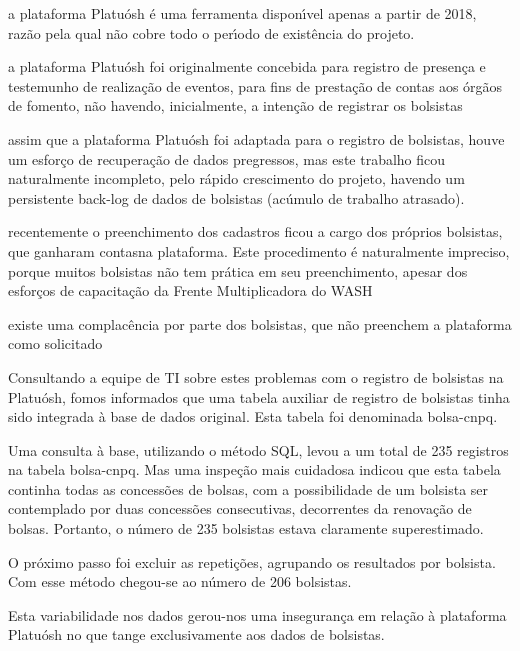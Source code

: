 \documentclass[
12pt,		%
openright,	%
twoside,  %
a4paper,			%
chapter=TITLE,		%
english,			%
french,				%
spanish,			%
brazil				%
]{USPSC-classe/USPSC}
\begin{document}
\begin{alineas}
\item a plataforma Platu\'osh \'e uma ferramenta dispon\'{\i}vel apenas a partir de 2018, raz\~ao pela qual n\~ao cobre todo o per\'{\i}odo de exist\^encia do projeto.
\item a plataforma Platu\'osh foi originalmente concebida para registro de presen\c{c}a e testemunho de realiza\c{c}\~ao de eventos, para fins de presta\c{c}\~ao de contas aos \'org\~aos de fomento, n\~ao havendo, inicialmente, a inten\c{c}\~ao de registrar os bolsistas
\item assim que a plataforma Platu\'osh foi adaptada para o registro de bolsistas, houve um esfor\c{c}o de recupera\c{c}\~ao de dados pregressos, mas este trabalho ficou naturalmente incompleto, pelo r\'apido crescimento do projeto, havendo um persistente back-log de dados de bolsistas (ac\'umulo de trabalho atrasado).
\item recentemente o preenchimento dos cadastros ficou a cargo dos pr\'oprios bolsistas, que ganharam \textquotedbl contas\textquotedbl  na plataforma. Este procedimento \'e naturalmente impreciso, porque muitos bolsistas n\~ao tem pr\'atica em seu preenchimento, apesar dos esfor\c{c}os de capacita\c{c}\~ao da Frente Multiplicadora do WASH
\item existe uma complac\^encia por parte dos bolsistas, que n\~ao preenchem a plataforma como solicitado
\end{alineas}

Consultando a equipe de TI sobre estes problemas com o registro de bolsistas na Platu\'osh, fomos informados que uma tabela auxiliar de registro de bolsistas tinha sido integrada \`a base de dados original. Esta tabela foi denominada \textquotedbl bolsa-cnpq\textquotedbl .


Uma consulta \`a base, utilizando o m\'etodo SQL, levou a um total de 235 registros na tabela \textquotedbl bolsa-cnpq\textquotedbl . Mas uma inspe\c{c}\~ao mais cuidadosa indicou que esta tabela continha todas as concess\~oes de bolsas, com a possibilidade de um bolsista ser contemplado por duas concess\~oes consecutivas, decorrentes da renova\c{c}\~ao de bolsas. Portanto, o n\'umero de 235 bolsistas estava claramente superestimado.


O pr\'oximo passo foi excluir as repeti\c{c}\~oes, agrupando os resultados por bolsista. Com esse m\'etodo chegou-se ao n\'umero de 206 bolsistas.


Esta variabilidade nos dados gerou-nos uma inseguran\c{c}a em rela\c{c}\~ao \`a plataforma Platu\'osh no que tange exclusivamente aos dados de bolsistas.
\end{document}

